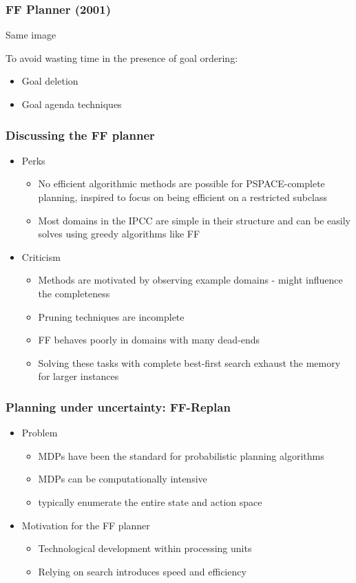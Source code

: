\documentclass{beamer}
\let\origframetitle=\frametitle
\renewcommand\frametitle[1]{\origframetitle{\textbf{\large{\textrm{#1}}}}}
\begin{document}
\begin{frame}
  \frametitle{FF Planner (2001)}
    Same image

  To avoid wasting time in the presence of goal ordering:

  \begin{itemize}
    \item Goal deletion
    \item Goal agenda techniques
  \end{itemize}

\end{frame}

\begin{frame}
  \frametitle{Discussing the FF planner}

\begin{itemize}
\item  Perks
  \begin{itemize}
    \item No efficient algorithmic methods are possible for PSPACE-complete planning, inspired to focus on being efficient on a restricted subclass
    \item Most domains in the IPCC are simple in their structure and can be easily solves using greedy algorithms like FF
  \end{itemize}
\item Criticism
  \begin{itemize}
    \item Methods are motivated by observing example domains - might influence the completeness
    \item Pruning techniques are incomplete
    \item FF behaves poorly in domains with many dead-ends
    \item Solving these tasks with complete best-first search exhaust the memory for larger instances
  \end{itemize}
\end{itemize}
\end{frame}


\begin{frame}
  \frametitle{Planning under uncertainty: FF-Replan}

  \begin{itemize}
    \item Problem
	\begin{itemize}
        	\item MDPs have been the standard for probabilistic planning algorithms
        	\item MDPs can be computationally intensive
	\item typically enumerate the entire state and action space
      	\end{itemize}
   \item Motivation for the FF planner
	\begin{itemize}
	\item Technological development within processing units
	\item Relying on search introduces speed and efficiency
	\end{itemize}
  \end{itemize}
\end{frame}
\end{document}
